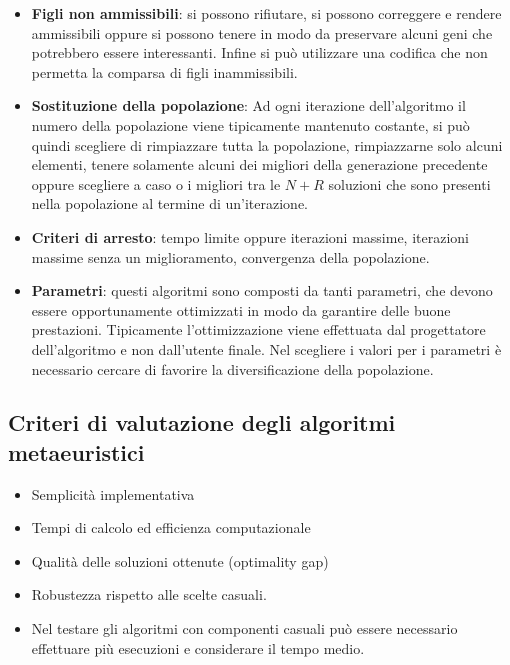 \begin{itemize}
	\item \textbf{Figli non ammissibili}: si possono rifiutare, si possono correggere e rendere ammissibili oppure si possono tenere in modo da preservare alcuni geni che potrebbero essere interessanti. Infine si può utilizzare una codifica che non permetta la comparsa di figli inammissibili.
	\item \textbf{Sostituzione della popolazione}: Ad ogni iterazione dell'algoritmo il numero della popolazione viene tipicamente mantenuto costante, si può quindi scegliere di rimpiazzare tutta la popolazione, rimpiazzarne solo alcuni elementi, tenere solamente alcuni dei migliori della generazione precedente oppure scegliere a caso o i migliori tra le $N+R$ soluzioni che sono presenti nella popolazione al termine di un'iterazione.
	\item \textbf{Criteri di arresto}: tempo limite oppure iterazioni massime, iterazioni massime senza un miglioramento, convergenza della popolazione. 
	\item \textbf{Parametri}: questi algoritmi sono composti da tanti parametri, che devono essere opportunamente ottimizzati in modo da garantire delle buone prestazioni. Tipicamente l'ottimizzazione viene effettuata dal progettatore dell'algoritmo e non dall'utente finale. Nel scegliere i valori per i parametri è necessario cercare di favorire la diversificazione della popolazione.
\end{itemize}


\subsection{Criteri di valutazione degli algoritmi metaeuristici}

\begin{itemize}	
	\item Semplicità implementativa
	\item Tempi di calcolo ed efficienza computazionale
	\item Qualità delle soluzioni ottenute (optimality gap)
	\item Robustezza rispetto alle scelte casuali.
	\item Nel testare gli algoritmi con componenti casuali può essere necessario effettuare più esecuzioni e considerare il tempo medio.
\end{itemize}






